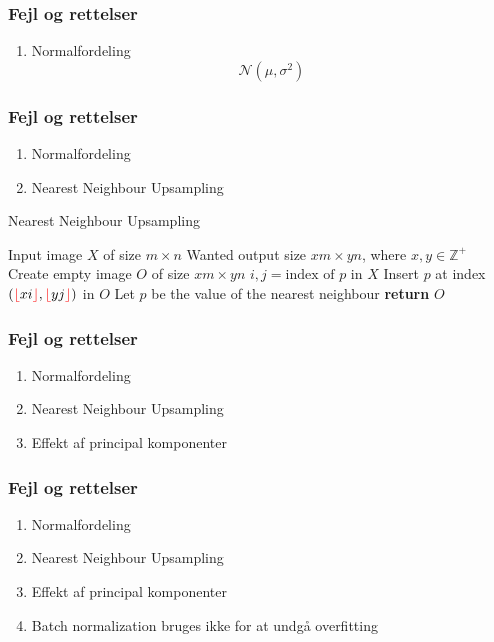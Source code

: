 \documentclass{beamer}
\begin{document}
\begin{frame}
    \frametitle{Fejl og rettelser}
    \begin{enumerate}
        \item<1-> Normalfordeling
        $$\mathcal{N} \left(\mu,  \sigma^2\right)$$
    \end{enumerate}
\end{frame}

\begin{frame}
    \frametitle{Fejl og rettelser}
    \begin{enumerate}
        \item Normalfordeling
        \item Nearest Neighbour Upsampling
    \end{enumerate}
    \begin{algorithm}[H]
        \caption{Nearest Neighbour Upsampling}
        \begin{algorithmic}[1]
            \Require Input image $X$ of size $m \times n$
            \Require Wanted output size $xm \times yn$, where $x, y \in \mathbb{Z}^{+}$
            \State Create empty image $O$ of size $xm \times yn$
                \State $i,j = \text{index of } p \text{ in } X$
                \State Insert $p$ at index $(\color{red}{\lfloor}\color{black}xi\color{red}{\rfloor}\color{black}, \color{red}{\lfloor}\color{black}yj\color{red}{\rfloor}\color{black})$ in $O$
            \EndFor
                \State Let $p$ be the value of the nearest neighbour
            \EndFor
            \State \textbf{return} $O$
        \end{algorithmic}
    \end{algorithm}
\end{frame}

\begin{frame}
    \frametitle{Fejl og rettelser}
    \begin{enumerate}
        \item Normalfordeling
        \item Nearest Neighbour Upsampling
        \item Effekt af principal komponenter
    \end{enumerate}
\end{frame}

\begin{frame}
    \frametitle{Fejl og rettelser}
    \begin{enumerate}
        \item Normalfordeling
        \item Nearest Neighbour Upsampling
        \item Effekt af principal komponenter
        \item Batch normalization bruges ikke for at undgå overfitting
    \end{enumerate}
\end{frame}
\end{document}
